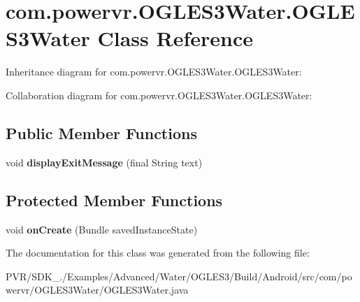 \hypertarget{classcom_1_1powervr_1_1_o_g_l_e_s3_water_1_1_o_g_l_e_s3_water}{\section{com.\+powervr.\+O\+G\+L\+E\+S3\+Water.\+O\+G\+L\+E\+S3\+Water Class Reference}
\label{classcom_1_1powervr_1_1_o_g_l_e_s3_water_1_1_o_g_l_e_s3_water}
}


Inheritance diagram for com.\+powervr.\+O\+G\+L\+E\+S3\+Water.\+O\+G\+L\+E\+S3\+Water\+:


Collaboration diagram for com.\+powervr.\+O\+G\+L\+E\+S3\+Water.\+O\+G\+L\+E\+S3\+Water\+:
\subsection*{Public Member Functions}
\begin{DoxyCompactItemize}
\item 
\hypertarget{classcom_1_1powervr_1_1_o_g_l_e_s3_water_1_1_o_g_l_e_s3_water_a4c9ec90af0a30f7ef68f1b790c5ee17a}{void {\bfseries display\+Exit\+Message} (final String text)}\label{classcom_1_1powervr_1_1_o_g_l_e_s3_water_1_1_o_g_l_e_s3_water_a4c9ec90af0a30f7ef68f1b790c5ee17a}

\end{DoxyCompactItemize}
\subsection*{Protected Member Functions}
\begin{DoxyCompactItemize}
\item 
\hypertarget{classcom_1_1powervr_1_1_o_g_l_e_s3_water_1_1_o_g_l_e_s3_water_a267a6631eec514f5cb1b1220e6c5f87b}{void {\bfseries on\+Create} (Bundle saved\+Instance\+State)}\label{classcom_1_1powervr_1_1_o_g_l_e_s3_water_1_1_o_g_l_e_s3_water_a267a6631eec514f5cb1b1220e6c5f87b}

\end{DoxyCompactItemize}


The documentation for this class was generated from the following file\+:\begin{DoxyCompactItemize}
\item 
P\+V\+R/\+S\+D\+K\+\_./\+Examples/\+Advanced/\+Water/\+O\+G\+L\+E\+S3/\+Build/\+Android/src/com/powervr/\+O\+G\+L\+E\+S3\+Water/O\+G\+L\+E\+S3\+Water.\+java\end{DoxyCompactItemize}
